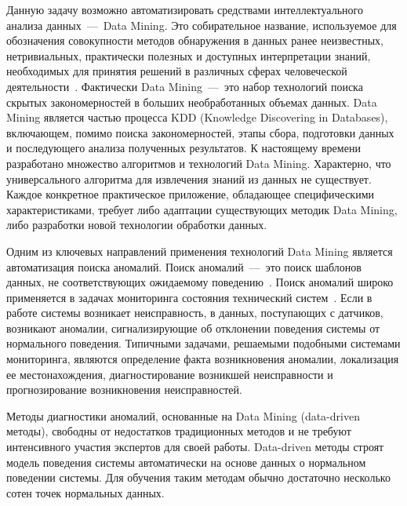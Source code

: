 Данную задачу возможно автоматизировать средствами интеллектуального анализа данных~--–~Data Mining. Это собирательное название, используемое для обозначения совокупности методов обнаружения в данных ранее неизвестных, нетривиальных, практически полезных и доступных интерпретации знаний, необходимых для принятия решений в различных сферах человеческой деятельности~\cite{ShapiroDataMining}. Фактически Data Mining~---~это набор технологий поиска скрытых закономерностей в больших необработанных объемах данных. Data Mining является частью процесса KDD (Knowledge Discovering in Databases), включающем, помимо поиска закономерностей, этапы сбора, подготовки данных и последующего анализа полученных результатов. К настоящему времени разработано множество алгоритмов и технологий Data Mining. Характерно, что универсального алгоритма для извлечения знаний из данных не существует. Каждое конкретное практическое приложение, обладающее специфическими характеристиками, требует либо адаптации существующих методик Data Mining, либо разработки новой технологии обработки данных.

Одним из ключевых направлений применения технологий Data Mining является автоматизация поиска аномалий. Поиск аномалий~---~это поиск шаблонов данных, не соответствующих ожидаемому поведению~\cite{AnomalyDetectionASurvey}. Поиск аномалий широко применяется в задачах мониторинга состояния технический систем~\cite{DerevyanenkoDataMining}. Если в работе системы возникает неисправность, в данных, поступающих с датчиков, возникают аномалии, сигнализирующие об отклонении поведения системы от нормального поведения. Типичными задачами, решаемыми подобными системами мониторинга, являются определение факта возникновения аномалии, локализация ее местонахождения, диагностирование возникшей неисправности и прогнозирование возникновения неисправностей.

Методы диагностики аномалий, основанные на Data Mining (data-driven методы), свободны от недостатков традиционных методов и не требуют интенсивного участия экспертов для своей работы. Data-driven методы строят модель поведения системы автоматически на основе данных о нормальном поведении системы. Для обучения таким методам обычно достаточно несколько сотен точек нормальных данных.

